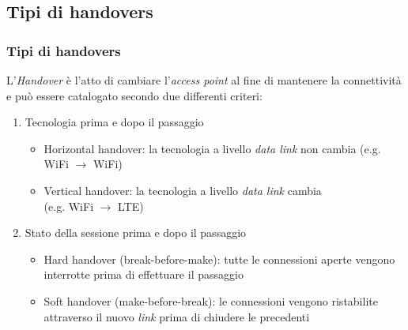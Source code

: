 \documentclass[10pt]{beamer}
\begin{document}
\subsection{Tipi di handovers}
\begin{frame}
\frametitle{Tipi di handovers}
L'{\em Handover} è l'atto di cambiare l'{\em access point} al fine di mantenere la connettività e può essere catalogato secondo due differenti criteri:
\begin{enumerate}
\item Tecnologia prima e dopo il passaggio
\begin{itemize}
\item Horizontal handover: la tecnologia a livello {\em data link} non cambia (e.g. WiFi $\to$ WiFi)
\item Vertical handover: la tecnologia a livello {\em data link} cambia \\(e.g. WiFi $\to$ LTE)
\end{itemize}

\item Stato della sessione prima e dopo il passaggio
\begin{itemize}
\item Hard handover (break-before-make): tutte le connessioni aperte vengono interrotte prima di effettuare il passaggio
\item Soft handover (make-before-break):  le connessioni vengono ristabilite attraverso il nuovo {\em link} prima di chiudere le precedenti
\end{itemize}
\end{enumerate}
\end{frame}

\end{document}
